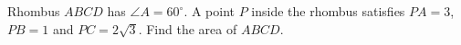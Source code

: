 Rhombus $ABCD$ has $\angle A=60^\circ$. A point $P$ inside the rhombus satisfies $PA=3$, $PB=1$ and $PC=2\sqrt3$. Find the area of $ABCD$.

